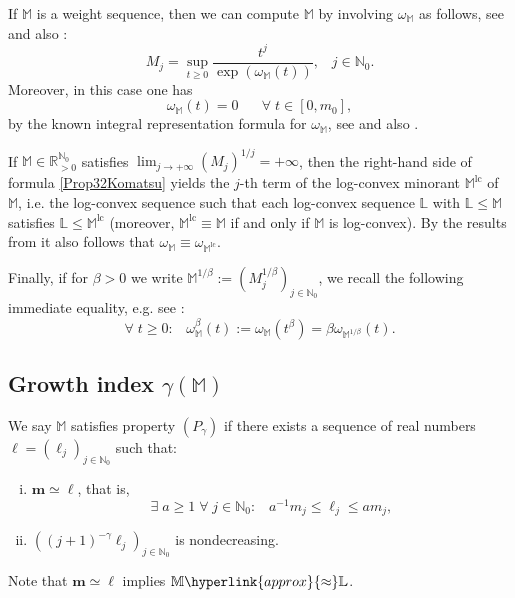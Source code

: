 \documentclass[11pt,a4paper]{article}
\theoremstyle{plain}
\theoremstyle{definition}
\newcommand{\RR}{\mathbb{R}}
\newcommand{\NN}{\mathbb{N}}
\newcommand{\M}{\mathbb{M}}
\newcommand{\m}{\boldsymbol{m}}
\newcommand{\LL}{\mathbb{L}}
\let\on=\operatorname
\begin{document}
If $\M$ is a weight sequence, then we can compute $\M$ by involving $\omega_\M$ as follows, see \cite[Chapitre I, 1.4, 1.8]{mandelbrojtbook} and also \cite[Prop. 3.2]{Komatsu73}:
\begin{equation}\label{Prop32Komatsu}
	M_j=\sup_{t\ge 0}\frac{t^j}{\exp(\omega_{\M}(t))},\;\;\;j\in\NN_0.
\end{equation}
Moreover, in this case one has
\begin{equation*}%
	\omega_\M(t)=0\hspace{20pt}\forall\;t\in[0,m_0],
\end{equation*}
by the known integral representation formula for $\omega_\M$, see \cite[1.8. III]{mandelbrojtbook} and also \cite[$(3.11)$]{Komatsu73}.

If $\M\in\RR_{>0}^{\NN_0}$ satisfies $\lim_{j\rightarrow+\infty}(M_j)^{1/j}=+\infty$, then the right-hand side of formula \eqref{Prop32Komatsu} yields the $j$-th term of the log-convex minorant $\M^{\on{lc}}$ of $\M$, i.e. the log-convex sequence such that each log-convex sequence $\LL$ with $\LL\le \M$ satisfies $\LL\le \M^{\on{lc}}$ (moreover, $\M^{\on{lc}}\equiv \M$ if and only if $\M$ is log-convex). By the results from \cite[Chapitre I]{mandelbrojtbook} it also follows that $\omega_\M\equiv\omega_{\M^{\on{lc}}}$.

Finally, if for $\beta>0$ we write $\M^{1/\beta}:=(M_j^{1/\beta})_{j\in\NN_0}$, we recall the following immediate equality, e.g. see  \cite[$(2.7)$]{sectorialextensions}:
\begin{equation*}%
	\forall\;t\ge 0:\;\;\;\omega_{\M}^{\beta}(t):=\omega_{\M}(t^{\beta})=\beta\omega_{\M^{1/\beta}}(t).
\end{equation*}

\subsection{Growth index $\gamma(\M)$}\label{ssect.IndexgammaM}

We say $\M$ satisfies property $\left(P_{\gamma}\right)$ if there exists a sequence of real numbers $\boldsymbol{\ell}=(\ell_{j})_{j\in\NN_0}$
such that:
\begin{enumerate}[(i)]
	\item $\m\simeq\boldsymbol{\ell}$, that is,
	$$\exists\;a\ge 1\;\forall\;j\in\NN_0:\;\;\;a^{-1}m_j\le \ell_j\le a m_j,$$
	
	\item $\left((j+1)^{-\gamma}\ell_{j}\right)_{j\in\NN_0}$ is nondecreasing.
\end{enumerate}
Note that $\m\simeq\boldsymbol{\ell}$ implies $\M\hyperlink{approx}{\approx}\LL$.
\end{document}
